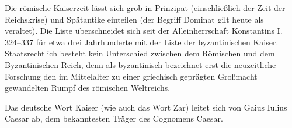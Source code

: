 Die römische Kaiserzeit lässt sich grob in Prinzipat (einschließlich der Zeit der Reichskrise) und Spätantike einteilen (der Begriff Dominat gilt heute als veraltet). Die Liste überschneidet sich seit der Alleinherrschaft Konstantins I. 324–337 für etwa drei Jahrhunderte mit der Liste der byzantinischen Kaiser. Staatsrechtlich besteht kein Unterschied zwischen dem Römischen und dem Byzantinischen Reich, denn als byzantinisch bezeichnet erst die neuzeitliche Forschung den im Mittelalter zu einer griechisch geprägten Großmacht gewandelten Rumpf des römischen Weltreichs.

Das deutsche Wort Kaiser (wie auch das Wort Zar) leitet sich von Gaius Iulius Caesar ab, dem bekanntesten Träger des Cognomens Caesar.



 
